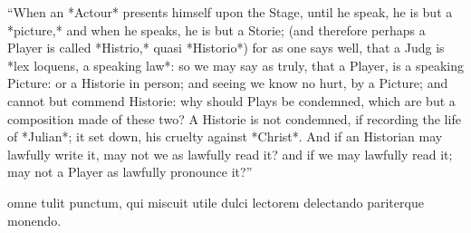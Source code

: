 ``When an *Actour* presents himself upon the Stage, until he speak, he is but a *picture,* and when he speaks, he is but a Storie; (and therefore perhaps a Player is called *Histrio,* quasi *Historio*) for as one says well, that a Judg is *lex loquens, a speaking law*: so we may say as truly, that a Player, is a speaking Picture: or a Historie in person; and seeing we know no hurt, by a Picture; and cannot but commend Historie: why should Plays be condemned, which are but a composition made of these two? A Historie is not condemned, if recording the life of *Julian*; it set down, his cruelty against *Christ*. And if an Historian may lawfully write it, may not we as lawfully read it? and if we may lawfully read it; may not a Player as lawfully pronounce it?''~\cite[42--43]{RichardBaker}

omne tulit punctum, qui miscuit utile dulci 
lectorem delectando pariterque monendo.~\cite[ll. 343--344]{Horace}